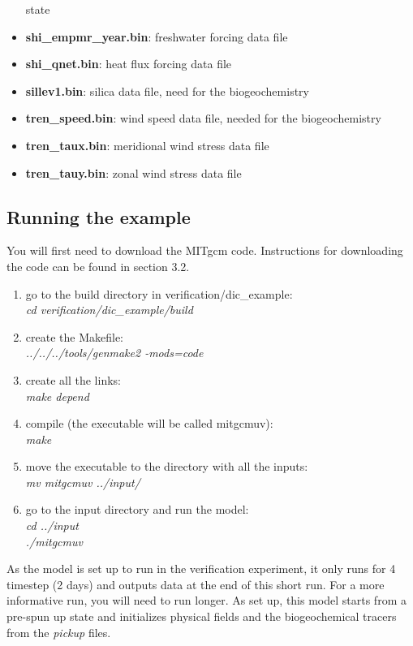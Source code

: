 \begin{itemize}
  state
\item {\bf shi\_empmr\_year.bin}: freshwater forcing data file
\item {\bf shi\_qnet.bin}: heat flux forcing data file
\item {\bf sillev1.bin}: silica data file, need for the
  biogeochemistry
\item {\bf tren\_speed.bin}: wind speed data file, needed for the
  biogeochemistry
\item {\bf tren\_taux.bin}: meridional wind stress data file
\item {\bf tren\_tauy.bin}: zonal wind stress data file
\end{itemize}


\subsection{Running the example}

You will first need to download the MITgcm code. Instructions for
downloading the code can be found in section 3.2.

\begin{enumerate}
\item{go to the build directory in verification/dic\_example:\\
    \hspace{1cm}  {\it cd verification/dic\_example/build}}
\item{create the Makefile:\\
    \hspace{1cm}  {\it ../../../tools/genmake2 -mods=code}}
\item{create all the links:\\
    \hspace{1cm}  {\it make depend}}
\item{compile (the executable will be called mitgcmuv):\\
    \hspace{1cm}  {\it make}}
\item{move the executable to the directory with all the inputs:\\
    \hspace{1cm}  {\it mv mitgcmuv ../input/}}
\item{go to the input directory and run the model:\\
    \hspace{1cm}  {\it cd ../input}\\
    \hspace{1cm}  {\it ./mitgcmuv}}
\end{enumerate}
As the model is set up to run in the verification experiment, it only
runs for 4 timestep (2 days) and outputs data at the end of this short
run. For a more informative run, you will need to run longer. As set
up, this model starts from a pre-spun up state and initializes
physical fields and the biogeochemical tracers from the {\it pickup}
files.

